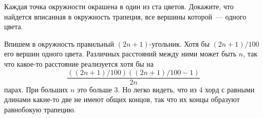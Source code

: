 Каждая точка окружности окрашена в один из ста цветов.
Докажите, что найдется вписанная в окружность трапеция, все вершины которой~---
одного цвета.

\solution
Впишем в окружность правильный $(2 n + 1)$-угольник.
Хотя бы $(2 n + 1) / 100$ его вершин одного цвета.
Различных расстояний между ними может быть $n$, так что какое-то расстояние
реализуется хотя бы на
\[
    \dfrac{((2 n + 1) / 100)((2 n + 1) / 100 - 1)}{2 n}
\]
парах.
При больших $n$ это больше 3.
Но легко видеть, что из 4 хорд с равными длинами какие-то две не имеют общих
концов, так что их концы образуют равнобокую трапецию.

